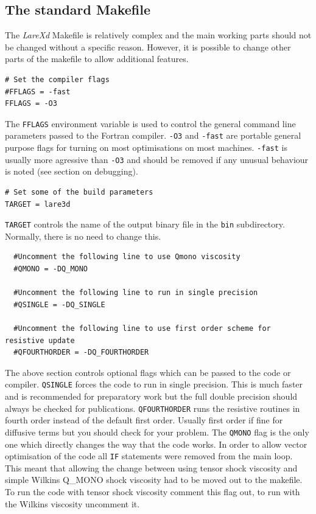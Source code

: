 \documentclass[11pt]{article}
\begin{document}
\subsection{The standard Makefile}
The {\it LareXd} Makefile is relatively complex and the main working parts should not be changed without a specific reason. However, it is possible to change other parts of the makefile to allow additional features.\\
\begin{verbatim}
# Set the compiler flags
#FFLAGS = -fast
FFLAGS = -O3
\end{verbatim}
The \texttt{FFLAGS} environment variable is used to control the general command line parameters passed to the Fortran compiler. \texttt{-O3} and \texttt{-fast} are portable general purpose flags for turning on most optimisations on most machines. \texttt{-fast} is usually more agressive than \texttt{-O3} and should be removed if any unusual behaviour is noted (see section on debugging).
\begin{verbatim}
# Set some of the build parameters
TARGET = lare3d
\end{verbatim}
\texttt{TARGET} controls the name of the output binary
file in the \texttt{bin} subdirectory. Normally, there is no need to change this.
\begin{verbatim}
  #Uncomment the following line to use Qmono viscosity
  #QMONO = -DQ_MONO

  #Uncomment the following line to run in single precision
  #QSINGLE = -DQ_SINGLE

  #Uncomment the following line to use first order scheme for resistive update
  #QFOURTHORDER = -DQ_FOURTHORDER
\end{verbatim}
The above section controls optional flags which can be passed to the code or compiler. \texttt{QSINGLE} forces the code to run in single precision. This is much faster and is recommended for preparatory work but the full double precision should always be checked for publications. \texttt{QFOURTHORDER} runs the resistive routines in fourth order instead of the default first order. Usually first order if fine for diffusive terms but you should
check for your problem.
The \texttt{QMONO} flag is the only one which directly changes the way that the code works. In order to allow vector optimisation of the code all \texttt{IF} statements were removed from the main loop. This meant that allowing the change between using tensor shock viscosity and simple Wilkins Q\_MONO shock viscosity had to be moved out to the makefile. To run the code with tensor shock viscosity comment this flag out, to run with the Wilkins viscosity uncomment it.
\end{document}
